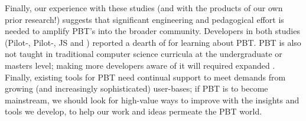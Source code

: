 Finally, our experience with these studies (and with the products of
our own prior research!) suggests
that significant engineering and pedagogical effort is needed to amplify
PBT's  into the broader community.  Developers in both studies
(Pilot-, Pilot-, JS  and
) reported a dearth of  for
learning about PBT.  PBT is also not
taught in traditional computer science curricula at the undergraduate
or masters level; making more developers
aware of it will required expanded
.
%
Finally, existing tools for PBT need continual
support to meet demands from growing (and increasingly sophisticated)
user-bases; if PBT is to become mainstream, we should look for high-value
ways to improve
 with the insights and tools we develop, to help our
work and ideas permeate the PBT world.




